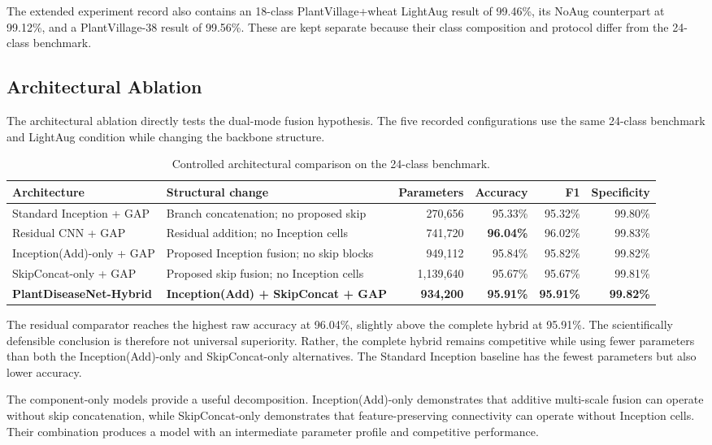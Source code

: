 \documentclass[a4paper,fleqn]{cas-dc}
\begin{document}
The extended experiment record also contains an 18-class PlantVillage+wheat LightAug result of 99.46\%, its NoAug counterpart at 99.12\%, and a PlantVillage-38 result of 99.56\%. These are kept separate because their class composition and protocol differ from the 24-class benchmark.

\subsection{Architectural Ablation}
\label{sec:ablation}
The architectural ablation directly tests the dual-mode fusion hypothesis. The five recorded configurations use the same 24-class benchmark and LightAug condition while changing the backbone structure.

\begin{table}[!t]
\centering
\caption{Controlled architectural comparison on the 24-class benchmark.}
\label{tab:ablation}
\small
\begin{tabular}{p{4.0cm}p{4.7cm}rrrr}
\toprule
Architecture & Structural change & Parameters & Accuracy & F1 & Specificity \\
\midrule
Standard Inception + GAP & Branch concatenation; no proposed skip & 270,656 & 95.33\% & 95.32\% & 99.80\% \\
Residual CNN + GAP & Residual addition; no Inception cells & 741,720 & \textbf{96.04\%} & 96.02\% & 99.83\% \\
Inception(Add)-only + GAP & Proposed Inception fusion; no skip blocks & 949,112 & 95.84\% & 95.82\% & 99.82\% \\
SkipConcat-only + GAP & Proposed skip fusion; no Inception cells & 1,139,640 & 95.67\% & 95.67\% & 99.81\% \\
\textbf{PlantDiseaseNet-Hybrid} & \textbf{Inception(Add) + SkipConcat + GAP} & \textbf{934,200} & \textbf{95.91\%} & \textbf{95.91\%} & \textbf{99.82\%} \\
\bottomrule
\end{tabular}
\end{table}

The residual comparator reaches the highest raw accuracy at 96.04\%, slightly above the complete hybrid at 95.91\%. The scientifically defensible conclusion is therefore not universal superiority. Rather, the complete hybrid remains competitive while using fewer parameters than both the Inception(Add)-only and SkipConcat-only alternatives. The Standard Inception baseline has the fewest parameters but also lower accuracy.

The component-only models provide a useful decomposition. Inception(Add)-only demonstrates that additive multi-scale fusion can operate without skip concatenation, while SkipConcat-only demonstrates that feature-preserving connectivity can operate without Inception cells. Their combination produces a model with an intermediate parameter profile and competitive performance.
\end{document}
